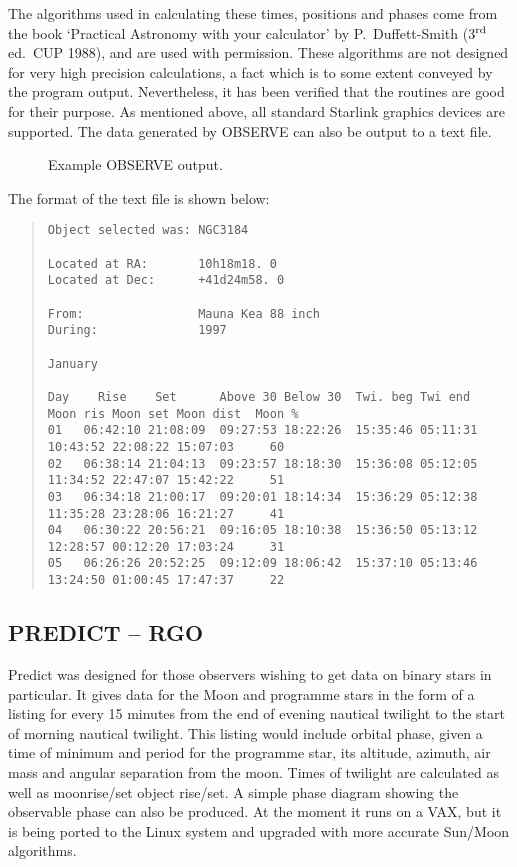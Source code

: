 \documentclass[twoside,11pt]{article}
\newcommand{\xref}[3]{#1}
\newcommand{\xlabel}[1]{}
\newcommand{\OBSERVEref}{\xref{OBSERVE}{sun146}{}}
\begin{document}
The algorithms used in calculating these times, positions and phases come
from the book `Practical Astronomy with your calculator' by
P.~Duffett-Smith (3$^{\rm rd}$ ed.~CUP 1988), and are used with permission.
These algorithms are not designed for very high precision calculations, a
fact which is to some extent conveyed by the program output. Nevertheless,
it has been verified that the routines are good for their purpose.
As mentioned above, all standard Starlink graphics devices are supported.
The data generated by {\OBSERVEref} can also be output to a text file.

\begin{figure}[htbp]
\leavevmode
\centering {}
\caption{Example OBSERVE output.}
\end{figure}

The format of the text file is shown below:
{\scriptsize
\begin{quote}
\begin{verbatim}
Object selected was: NGC3184

Located at RA:       10h18m18. 0
Located at Dec:      +41d24m58. 0

From:                Mauna Kea 88 inch
During:              1997

January

Day    Rise    Set      Above 30 Below 30  Twi. beg Twi end   Moon ris Moon set Moon dist  Moon %
01   06:42:10 21:08:09  09:27:53 18:22:26  15:35:46 05:11:31  10:43:52 22:08:22 15:07:03     60
02   06:38:14 21:04:13  09:23:57 18:18:30  15:36:08 05:12:05  11:34:52 22:47:07 15:42:22     51
03   06:34:18 21:00:17  09:20:01 18:14:34  15:36:29 05:12:38  11:35:28 23:28:06 16:21:27     41
04   06:30:22 20:56:21  09:16:05 18:10:38  15:36:50 05:13:12  12:28:57 00:12:20 17:03:24     31
05   06:26:26 20:52:25  09:12:09 18:06:42  15:37:10 05:13:46  13:24:50 01:00:45 17:47:37     22
\end{verbatim}
\end{quote}
}

\subsection{PREDICT -- RGO} \xlabel{PREDICT}
\label{sec:predict}

Predict was designed for those observers wishing to get data on binary stars
in particular. It gives data for the Moon and programme stars in the form of
a listing for every 15 minutes from the end of evening nautical twilight to
the start of morning nautical twilight. This listing would include orbital
phase, given a time of minimum and period for the programme star, its
altitude, azimuth, air mass and angular separation from the moon. Times of
twilight are calculated as well as moonrise/set object rise/set. A simple
phase diagram showing the observable phase can also be produced.  At the
moment it runs on a VAX, but it is being ported to the Linux system and upgraded
with more accurate Sun/Moon algorithms.
\end{document}
